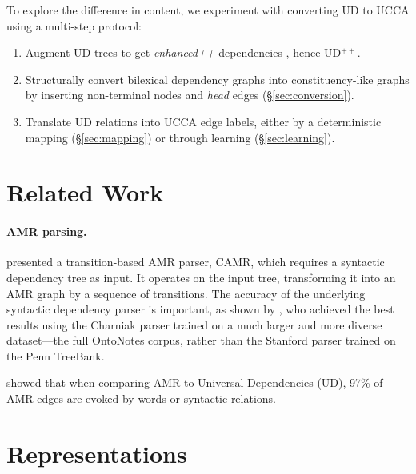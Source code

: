 \documentclass[11pt,a4paper]{article}
\begin{document}
To explore the difference in content, we experiment with converting UD to UCCA
using a multi-step protocol:
\begin{enumerate}
\item Augment UD trees to get \textit{enhanced++} dependencies \cite{SCHUSTER16.779}, hence UD$^{++}$.
\item Structurally convert bilexical dependency graphs into constituency-like graphs by inserting
  non-terminal nodes and \textit{head} edges (\S\ref{sec:conversion}).
\item Translate UD relations into UCCA edge labels,
  either by a deterministic mapping (\S\ref{sec:mapping})
  or through learning (\S\ref{sec:learning}).
\end{enumerate}

\section{Related Work}\label{sec:related_work}

\paragraph{AMR parsing.}

presented a transition-based AMR parser, CAMR, which requires a
syntactic dependency tree as input.
It operates on the input tree, transforming it into an AMR graph
by a sequence of transitions.
The accuracy of the underlying syntactic dependency parser is important,
as shown by ,
who achieved the best results using the Charniak parser trained on a
much larger and more diverse dataset---the full OntoNotes corpus,
rather than the Stanford parser trained on the Penn TreeBank.

 showed that when comparing AMR to Universal Dependencies (UD),
97\% of AMR edges are evoked by words or syntactic relations.



\section{Representations}\label{sec:representations}
\end{document}
